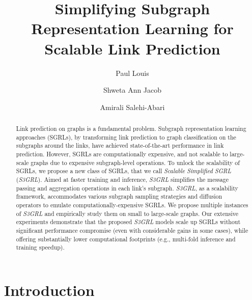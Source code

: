 \documentclass[sigconf, nonacm]{acmart}
\newcommand{\ssgrl}{\textit{S3GRL}\xspace}
\begin{document}
\title{Simplifying Subgraph Representation Learning for Scalable Link Prediction}

\author{Paul Louis}

\author{Shweta Ann Jacob}

\author{Amirali Salehi-Abari}

\renewcommand{\shortauthors}{Louis et al.}

\begin{abstract}
  Link prediction on graphs is a fundamental problem. Subgraph representation learning approaches (SGRLs), by transforming link prediction to graph classification on the subgraphs around the links, have achieved state-of-the-art performance in link prediction. However, SGRLs are computationally expensive, and not scalable to large-scale graphs due to expensive subgraph-level operations. To unlock the scalability of SGRLs, we propose a new class of SGRLs, that we call \textit{Scalable Simplified SGRL} (\ssgrl). Aimed at faster training and inference, \ssgrl simplifies the message passing and aggregation operations in each link's subgraph. \ssgrl, as a scalability framework, accommodates various subgraph sampling strategies and diffusion operators to emulate computationally-expensive SGRLs. We propose multiple instances of \ssgrl and empirically study them on small to large-scale graphs. Our extensive experiments demonstrate that the proposed \ssgrl models scale up SGRLs without significant performance compromise (even with considerable gains in some cases), while offering substantially lower computational footprints (e.g., multi-fold inference and training speedup).
\end{abstract}




\maketitle

\section{Introduction}
\end{document}
